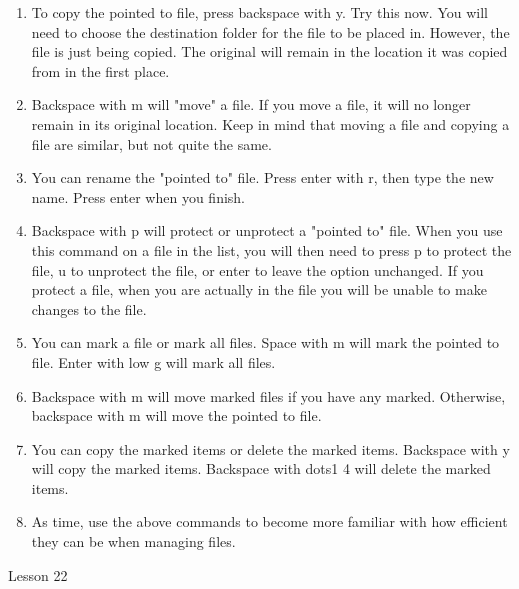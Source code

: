 \documentclass[10pt,letterpaper,twoside]{report}
\begin{document}
{{{{\begin{enumerate}
\begin{enumerate}
		      \item To copy the pointed to file, press backspace with y.  Try this now.  You will need to choose the destination folder for the file to be placed in.  However, the file is just being copied.  The original will remain in the location it was copied from in the first place.
		            
		      \item Backspace with m will "move" a file.  If you move a file, it will no longer remain in its original location.  Keep in mind that moving a file and copying a file are similar, but not quite the same.
		            
		      \item You can rename the "pointed to" file.  Press enter with r, then type the new name.  Press enter when you finish.
		            
		      \item Backspace with p will protect or unprotect a "pointed to" file.  When you use this command on a file in the list, you will then need to press p to protect the file, u to unprotect the file, or enter to leave the option unchanged.  If you protect a file, when you are actually in the file you will be unable to make changes to the file.
		            
		      \item You can mark a file or mark all files.  Space with m will mark the pointed to file.  Enter with low g will mark all files.
		            
		      \item Backspace with m will move marked files if you have any marked.  Otherwise, backspace with m will move the pointed to file.
		            
		      \item You can copy the marked items or delete the marked items.  Backspace with y will copy the marked items.  Backspace with dots1 4 will delete the marked items.
		            
		      \item As time, use the above commands to become more familiar with how efficient they can be when managing files.
	      \end{enumerate}
	      
	      
	      
	      
	      
	      \clearpage
	      
	      \newpage
	      Lesson 22
	      

\end{enumerate}}}}}
\end{document}
